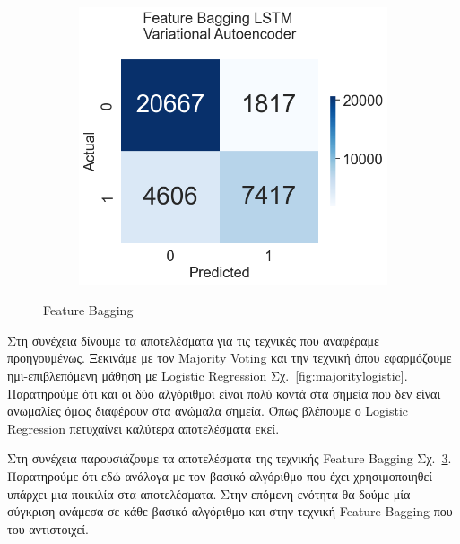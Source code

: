 \documentclass[a4paper,12pt]{report}
\theoremstyle{definitionNODot}
\begin{document}
\begin{figure}[H]
\begin{subfigure}[b]{0.35\textwidth}
			\label{fig:anomaly_by_ensemble_ensemble_lstm_ae}
		\end{subfigure}
		\medskip
		\begin{subfigure}[b]{0.35\textwidth}
			\centering
			\includegraphics[width=\textwidth]{anomaly_by_ensemble_ensemble_lstm_vae.png}
			
			\label{fig:anomaly_by_ensemble_ensemble_lstm_vae}
		\end{subfigure}
		\caption{Feature Bagging}
		\label{fig:featurebaggingmodelsconfusion}
	\end{figure}
	
	Στη συνέχεια δίνουμε τα αποτελέσματα για τις τεχνικές που αναφέραμε προηγουμένως. Ξεκινάμε με τον Majority Voting και την τεχνική όπου εφαρμόζουμε ημι-επιβλεπόμενη μάθηση με Logistic Regression Σχ.~\ref{fig:majoritylogistic}. Παρατηρούμε ότι και οι δύο αλγόριθμοι είναι πολύ κοντά στα σημεία που δεν είναι ανωμαλίες όμως διαφέρουν στα ανώμαλα σημεία. Όπως βλέπουμε ο Logistic Regression πετυχαίνει καλύτερα αποτελέσματα εκεί.
	
	Στη συνέχεια παρουσιάζουμε τα αποτελέσματα της τεχνικής Feature Bagging Σχ.~\ref{fig:featurebaggingmodelsconfusion}. Παρατηρούμε ότι εδώ ανάλογα με τον βασικό αλγόριθμο που έχει χρησιμοποιηθεί υπάρχει μια ποικιλία στα αποτελέσματα. Στην επόμενη ενότητα θα δούμε μία σύγκριση ανάμεσα σε κάθε βασικό αλγόριθμο και στην τεχνική Feature Bagging που του αντιστοιχεί.
	
\end{document}
